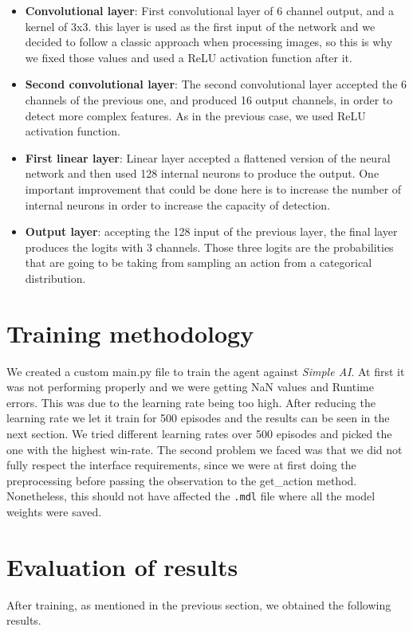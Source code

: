 \documentclass[12pt]{article}
\begin{document}
\begin{itemize}
    \item \textbf{Convolutional layer}: First convolutional layer of 6 channel output, and a kernel of 3x3. this layer is used as the first input of the network and we decided to follow a classic approach when processing images, so this is why we fixed those values and used a ReLU activation function after it.
    \item \textbf{Second convolutional layer}: The second convolutional layer accepted the 6 channels of the previous one, and produced 16 output channels, in order to detect more complex features. As in the previous case, we used ReLU activation function. 
    \item \textbf{First linear layer}: Linear layer accepted a flattened version of the neural network and then used 128 internal neurons to produce the output. One important improvement that could be done here is to increase the number of internal neurons in order to increase the capacity of detection.
    \item \textbf{Output layer}: accepting the 128 input of the previous layer, the final layer produces the logits with 3 channels. Those three logits are the probabilities that are going to be taking from sampling an action from a categorical distribution.
\end{itemize}

\section{Training methodology}

We created a custom main.py file to train the agent against \textit{Simple AI}. At first it was not performing properly and we were getting NaN values and Runtime errors. This was due to the learning rate being too high. After reducing the learning rate we let it train for 500 episodes and the results can be seen in the next section. We tried different learning rates over 500 episodes and picked the one with the highest win-rate. The second problem we faced was that we did not fully respect the interface requirements, since we were at first doing the preprocessing before passing the observation to the get\_action method. Nonetheless, this should not have affected the \texttt{.mdl} file where all the model weights were saved.

\section{Evaluation of results}
After training, as mentioned in the previous section, we obtained the following results.
\end{document}
